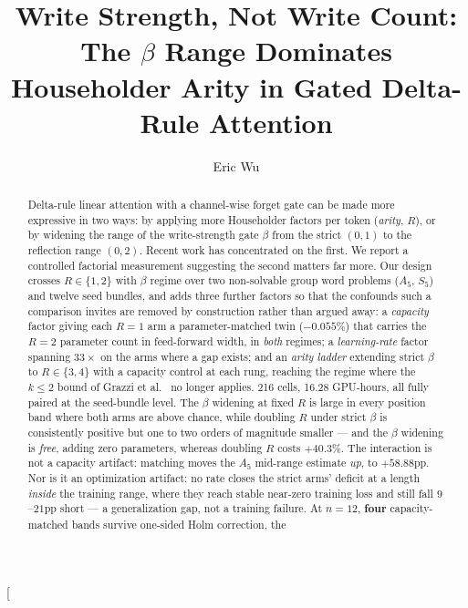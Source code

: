 \documentclass[10pt,twocolumn]{article}
\title{\bfseries Write Strength, Not Write Count: The $\beta$ Range Dominates\\
Householder Arity in Gated Delta-Rule Attention}
\author[1,2]{Eric Wu}
\affil[1]{Stanford University}
\affil[2]{Alpha AI Engineering}
\date{}
\begin{document}
\makeatletter
\twocolumn[\begin{@twocolumnfalse}
\maketitle
\begin{center}
\begin{minipage}{0.86\textwidth}
\begin{abstract}
\noindent
Delta-rule linear attention with a channel-wise forget gate can be made more
expressive in two ways: by applying more Householder factors per token
(\emph{arity}, $R$), or by widening the range of the write-strength gate $\beta$
from the strict $(0,1)$ to the reflection range $(0,2)$. Recent work has
concentrated on the first. We report a controlled factorial measurement
suggesting the second matters far more. Our design crosses $R\in\{1,2\}$ with
$\beta$ regime over two non-solvable group word problems ($A_5$, $S_5$) and
twelve seed bundles, and adds three further factors so that the confounds such a
comparison invites are removed by construction rather than argued away: a
\emph{capacity} factor giving each $R{=}1$ arm a parameter-matched twin
($-0.055\%$) that carries the $R{=}2$ parameter count in feed-forward width, in
\emph{both} regimes; a \emph{learning-rate} factor spanning $33\times$ on the
arms where a gap exists; and an \emph{arity ladder} extending strict $\beta$ to
$R\in\{3,4\}$ with a capacity control at each rung, reaching the regime where the
$k\le2$ bound of Grazzi et al.~\cite{grazzi2025} no longer applies. 216 cells, 16.28
GPU-hours, all fully paired at the
seed-bundle level. The $\beta$ widening at fixed $R$ is large in every position
band where both arms are above chance, while doubling $R$ under strict $\beta$ is
consistently positive but one to two orders of magnitude smaller --- and the
$\beta$ widening is \emph{free}, adding zero parameters, whereas doubling $R$
costs $+40.3\%$. The interaction is not a capacity artifact: matching moves the
$A_5$ mid-range estimate \emph{up}, to $+58.88$pp. Nor is it an optimization
artifact: no rate closes the strict arms' deficit at a length \emph{inside} the
training range, where they reach stable near-zero training loss and still fall
$9$--$21$pp short --- a generalization gap, not a training failure. At $n=12$,
\textbf{four} capacity-matched bands survive one-sided Holm correction, the

\end{abstract}
\end{minipage}
\end{center}
\end{@twocolumnfalse}
\end{document}
